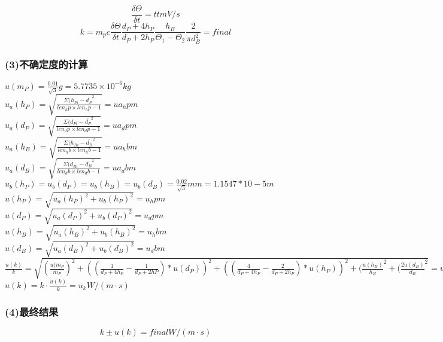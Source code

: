 $$\frac{\delta\Theta}{\delta t} = {{tt}}mV/s$$
$$k = m_pc\frac{\delta\Theta}{\delta t}\frac{d_P+4h_P}{d_P+2h_P}\frac{h_B}{\Theta_1-\Theta_2}\frac{2}{\pi d_B^2} = {{final}}$$

\subsubsection*{(3)不确定度的计算}
\noindent
$\displaystyle u(m_P) = \frac{0.01}{\sqrt3}g = 5.7735\times 10^{-6}kg$ \\

$\displaystyle u_a(h_P) = \sqrt{\frac{\Sigma(h_{Pi} - \overline{d_P}^2}{ {{len_hp}} \times {{len_hp - 1}} } } = {{ua_hp}}m$ \\
$\displaystyle u_a(d_P) = \sqrt{\frac{\Sigma(d_{Pi} - \overline{d_P}^2}{ {{len_dp}} \times {{len_dp - 1}} } } = {{ua_dp}}m$ \\
$\displaystyle u_a(h_B) = \sqrt{\frac{\Sigma(h_{Bi} - \overline{d_B}^2}{ {{len_hb}} \times {{len_hb - 1}} } } = {{ua_hb}}m$ \\
$\displaystyle u_a(d_B) = \sqrt{\frac{\Sigma(d_{Bi} - \overline{d_B}^2}{ {{len_db}} \times {{len_db - 1}} } } = {{ua_db}}m$ \\
$\displaystyle u_b(h_P) = u_b(d_P) = u_b(h_B) = u_b(d_B) = \frac{0.02}{\sqrt 3}mm = 1.1547*10-5m$ \\

$\displaystyle u(h_P) = \sqrt{u_a(h_P)^2 + u_b(h_P)^2} = {{u_hp}}m$ \\
$\displaystyle u(d_P) = \sqrt{u_a(d_P)^2 + u_b(d_P)^2} = {{u_dp}}m$ \\
$\displaystyle u(h_B) = \sqrt{u_a(h_B)^2 + u_b(h_B)^2} = {{u_hb}}m$ \\
$\displaystyle u(d_B) = \sqrt{u_a(d_B)^2 + u_b(d_B)^2} = {{u_db}}m$ \\

$\displaystyle \frac{u(k)}{k} = \sqrt{(\frac{u(m_P}{m_P})^2 + ((\frac{1}{d_P + 4h_P} - \frac{1}{d_P + 2hP}) * u(d_P))^2 + ((\frac{4}{d_P + 4h_P} - \frac{2}{d_P + 2h_P}) * u(h_P))^2 + (\frac{u(h_B)}{h_B}^2 + (\frac{2u(d_B)}{d_B}^2} = {{u_k_k}}$ \\

$\displaystyle u(k) = k\cdot\frac{u(k)}{k} = {{u_k}}W/(m\cdot s)$ \\


\subsubsection*{(4)最终结果}
\noindent
$$k \pm u(k) = {{final}} W/(m\cdot s)$$
